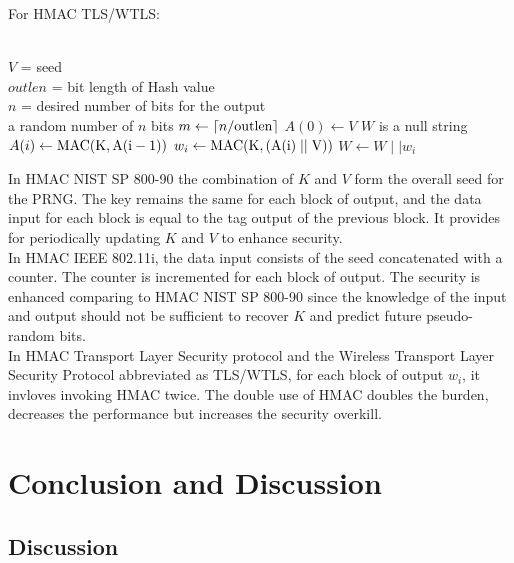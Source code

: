 \documentclass[12pt,a4paper,oneside]{report}
\begin{document}
For HMAC TLS/WTLS:
\begin{algorithm}
    \begin{algorithmic}
        \Require \\
        $V$ = seed\\
        $outlen$ = bit length of Hash value\\
        $n$ = desired number of bits for the output
        \Ensure \\
        a random number of $n$ bits
                \State $m \gets \lceil n/\rm{outlen} \rceil$ 
                \State $A(0) \gets V$ 
                \State $W$ is a null string
                    \State $A(i) \gets \rm{MAC}(K,A(i-1))$
                    \State $w_i \gets \rm{MAC}(K,(A(i)\mid \mid V))$  
                    \State $W \gets W \mid\mid w_i$  
                \EndFor
                \State {}  
        \EndFunction  
    \end{algorithmic}  
\end{algorithm}


In HMAC NIST SP 800-90 the combination of $K$ and $V$ form the overall seed for the PRNG. The key remains the same for each block of output, and the data input for each block is equal to the tag output of the previous block. It provides for periodically updating $K$ and $V$ to enhance security.\\


In HMAC IEEE 802.11i, the data input consists of the seed concatenated with a counter. The counter is incremented for each block of output. The security is enhanced comparing to HMAC NIST SP 800-90 since the knowledge of the input and output should not be sufficient to recover $K$ and predict future pseudo-random bits.\\


In HMAC Transport Layer Security protocol and the Wireless Transport Layer Security Protocol abbreviated as TLS/WTLS, for each block of output $w_i$, it invloves invoking HMAC twice. The double use of HMAC doubles the burden, decreases the performance but increases the security overkill.\\


\chapter{  Conclusion and Discussion}
\section{Discussion}
\end{document}

